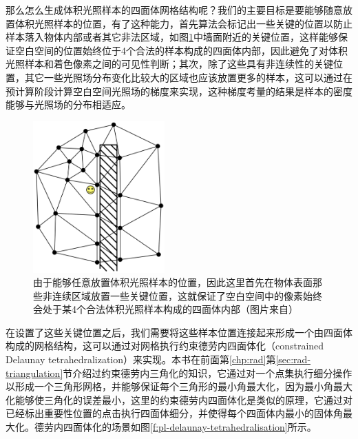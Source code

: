 那么怎么生成体积光照样本的四面体网格结构呢？我们的主要目标是要能够随意放置体积光照样本的位置，有了这种能力，首先算法会标记出一些关键的位置以防止样本落入物体内部或者其它非法区域，如图\ref{f:pl-key-points}中墙面附近的关键位置，这样能够保证空白空间的位置始终位于4个合法的样本构成的四面体内部，因此避免了对体积光照样本和着色像素之间的可见性判断；其次，除了这些具有非连续性的关键位置，其它一些光照场分布变化比较大的区域也应该放置更多的样本，这可以通过在预计算阶段计算空白空间光照场的梯度来实现，这种梯度考量的结果是样本的密度能够与光照场的分布相适应。

\begin{figure}
	\sidecaption
	\includegraphics[width=0.45\textwidth]{figures/pl/key-points}
	\caption{由于能够任意放置体积光照样本的位置，因此这里首先在物体表面那些非连续区域放置一些关键位置，这就保证了空白空间中的像素始终会处于某4个合法体积光照样本构成的四面体内部（图片来自\cite{a:Lightprobeinterpolationusingtetrahedraltessellations}）}
	\label{f:pl-key-points}
\end{figure}

在设置了这些关键位置之后，我们需要将这些样本位置连接起来形成一个由四面体构成的网格结构，这可以通过对网格执行约束德劳内四面体化（constrained Delaunay tetrahedralization）来实现。本书在前面第\ref{chp:rad}第\ref{sec:rad-triangulation}节介绍过约束德劳内三角化的知识，它通过对一个点集执行细分操作以形成一个三角形网格，并能够保证每个三角形的最小角最大化，因为最小角最大化能够使三角化的误差最小，这里的约束德劳内四面体化是类似的原理，它通过对已经标出重要性位置的点击执行四面体细分，并使得每个四面体内最小的固体角最大化。德劳内四面体化的场景如图\ref{f:pl-delaunay-tetrahedralisation}所示。

